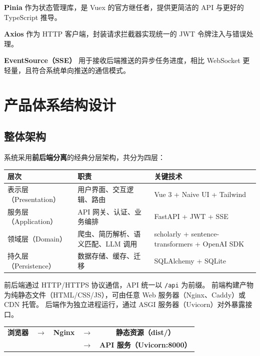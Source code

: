 \documentclass[11pt]{article}
\begin{document}
\textbf{Pinia} 作为状态管理库，是 Vuex 的官方继任者，提供更简洁的 API 与更好的 TypeScript 推导。

\textbf{Axios} 作为 HTTP 客户端，封装请求拦截器实现统一的 JWT 令牌注入与错误处理。

\textbf{EventSource（SSE）} 用于接收后端推送的异步任务进度，相比 WebSocket 更轻量，且符合系统单向推送的通信模式。

\section{产品体系结构设计}

\subsection{整体架构}

系统采用\textbf{前后端分离}的经典分层架构，共分为四层：

\begin{center}
\small
\begin{tabular}{|l|p{4.5cm}|p{5cm}|}
\hline
\textbf{层次} & \textbf{职责} & \textbf{关键技术} \\
\hline
表示层（Presentation） & 用户界面、交互逻辑、路由 & Vue 3 + Naive UI + Tailwind \\
\hline
服务层（Application） & API 网关、认证、业务编排 & FastAPI + JWT + SSE \\
\hline
领域层（Domain） & 爬虫、简历解析、语义匹配、LLM 调用 & scholarly + sentence-transformers + OpenAI SDK \\
\hline
持久层（Persistence） & 数据存储、缓存、迁移 & SQLAlchemy + SQLite \\
\hline
\end{tabular}
\end{center}

前后端通过 HTTP/HTTPS 协议通信，API 统一以 \texttt{/api} 为前缀。
前端构建产物为纯静态文件（HTML/CSS/JS），可由任意 Web 服务器（Nginx、Caddy）或 CDN 托管。
后端作为独立进程运行，通过 ASGI 服务器（Uvicorn）对外暴露接口。

\begin{center}
\begin{tabular}{ccccc}
\textbf{浏览器} & $\rightarrow$ & \textbf{Nginx} & $\rightarrow$ & \textbf{静态资源（dist/）} \\
& & & $\rightarrow$ & \textbf{API 服务（Uvicorn:8000）} \\
\end{tabular}
\end{center}
\end{document}
